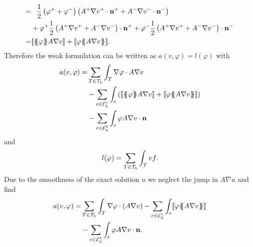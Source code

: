 \begin{definition} 
\begin{align*}
		    	  = & \phantom{+} \frac 1 2 \left(\varphi^+ + \varphi^- \right) \left(A^+ \nabla v^+ \cdot \mathbf n^+ + A^- \nabla v^- \cdot \mathbf n^- \right) \\
  &+  \varphi^+ \frac 1 2  \left(A^+ \nabla v^+ + A^- \nabla v^-\right) \cdot \mathbf n^+ + \varphi^- \frac 1 2 \left(A^+ \nabla v^+ + A^- \nabla v^-\right) \cdot \mathbf n^- \\
  = &  \jump {\average \varphi  A \nabla v}+ \jump {\varphi \average{ A \nabla v}}.
\end{align*}
Therefore the weak formulation can be written as $a(v,\varphi) = l(\varphi)$ with 
\begin{align*}
  a(v, \varphi) = & \sum\limits_{T \in \triang} \int_T \nabla \varphi \cdot A \nabla v \\
	& - \sum\limits_{e \in \edgesi}\int_{e} \left( \jump {\average \varphi A \nabla v} + \jump {\varphi \average{ A \nabla v}} \right)\\
& - \sum\limits_{e \in \edgesb}\int_{e} \varphi A \nabla v \cdot \mathbf n
\end{align*}
and
\[
l(\varphi) = \sum_{T \in \mathcal{T}_h} \int_T v f.
\]
Due to the smoothness of the exact solution $u$ we neglect the jump in $A \nabla u$ and find
\begin{align*}
 a(v, \varphi) = & \sum\limits_{T \in \triang} \int_T \nabla \varphi \cdot \left(A \nabla v\right) %
	- \sum\limits_{e \in \edgesi} \int _e\jump{ \varphi \average{ A \nabla v}} %
	\\
& - \sum\limits_{e \in \edgesb}\int_{e} \varphi A \nabla v \cdot \mathbf n.
\end{align*}


\end{definition}
